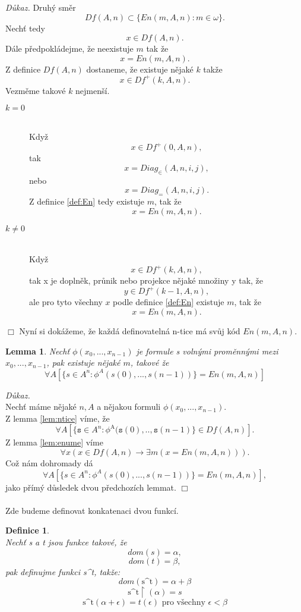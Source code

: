 \documentclass[12pt,a4paper]{article}
\newtheorem{lemma}[veta]{Lemma}
\newtheorem{definice}[veta]{Definice}
\newenvironment{proof}
{\noindent \textit{D\r{u}kaz.}}
{\hspace*{\fill} $\Box$}
\begin{document}
\begin{proof}
Druh\'{y} sm\v{e}r \[ Df(A,n) \subset\{En(m,A,n): m \in \omega \} .\] 
Nech\v{t} tedy \[  x \in  Df(A,n) .\] D\'{a}le p\v{r}edpokl\'{a}dejme, \v{z}e neexistuje $ m $ tak \v{z}e \[ x=En(m,A,n) .\]
Z definice  $ Df(A,n) $ dostaneme, \v{z}e existuje n\v{e}jak\'{e} $ k $ tak\v{z}e 
 \[  x \in  Df^+(k,A,n) .\] 
Vezm\v{e}me takov\'{e} $ k $ nejmen\v{s}\'{i}.
\begin{description}
  \item[$ k=0 $] ~\\ 
  Kdy\v{z} \[ x \in  Df^+(0,A,n), \] tak \[ x = Diag_{\in}(A,n,i,j) ,\] nebo \[ x = Diag_{=}(A,n,i,j) .\] 
  Z definice \ref{def:En} tedy existuje $ m $, tak \v{z}e \[ x=En(m,A,n) .\]
  \item[$ k \neq 0 $] ~\\
   Kdy\v{z} \[ x \in  Df^+(k,A,n), \] tak x je dopln\v{e}k, pr\r{u}nik nebo projekce n\v{e}jak\'{e} mno\v{z}iny y tak, \v{z}e \[ y \in  Df^+(k-1,A,n), \]  ale pro tyto v\v{s}echny $ x $ podle definice  \ref{def:En} existuje $ m $, tak \v{z}e \[ x=En(m,A,n) .\]
  \end{description}
 \end{proof}
\newpage
Nyn\'{i} si dok\'{a}\v{z}eme, \v{z}e ka\v{z}d\'{a} definovateln\'{a} n-tice m\'{a} sv\r{u}j k\'{o}d $ En(m,A,n) $.
\begin{lemma}
Nech\v{t} $ \phi(x_0,...,x_{n-1}) $ je formule s voln\'{y}mi prom\v{e}nn\'{y}mi mezi $ x_0,...,x_{n-1} $, pak existuje n\v{e}jak\'{e} $ m $, takov\'{e} \v{z}e
\[ \forall A [ \{ s \in A^n : \phi^A(s(0),...,s(n-1))\} = En(m,A,n)]  \]
\end{lemma}
\begin{proof}
~\\
Nech\v{t} m\'{a}me n\v{e}jak\'{e} $ n,A $ a n\v{e}jakou formuli $ \phi(x_0,...,x_{n-1}) $.\\  Z lemma \ref{lem:ntice} v\'{i}me, \v{z}e 
\[ \forall A [\{ \mathtt{s} \in A^n: \phi^\mathrm{A} (\mathtt{s}(0),..,\mathtt{s}(n-1)\} \in Df(A,n)]  . \]
Z lemma \ref{lem:enume} v\'{i}me 
\[ \forall x (x \in Df(A,n) \rightarrow \exists m (x = En(m,A,n))) .\]  
Co\v{z} n\'{a}m dohromady d\'{a}
\[ \forall A [ \{ s \in A^n : \phi^A(s(0),...,s(n-1))\} = En(m,A,n)] ,\]
jako p\v{r}\'{i}m\'{y} d\r{u}sledek dvou p\v{r}edchoz\'{i}ch lemmat.
\end{proof}~\\~\\
Zde budeme definovat konkatenaci dvou funkc\'{i}.
\begin{definice}
~\\
Nech\v{t} s a t jsou funkce takov\'{e}, \v{z}e  \[ dom(s)=\alpha ,\]  \[ dom(t)=\beta ,\]  pak definujme funkci s\textasciicircum t, tak\v{z}e: 
\[ dom(\text{s\textasciicircum t})=\alpha +\beta\]
 \[ \text{s\textasciicircum t} \upharpoonright( \alpha )= s  \]
\[  \text{s\textasciicircum t} (\alpha+\epsilon)=t(\epsilon) \text{  pro v\v{s}echny  } \epsilon < \beta  \]
\end{definice}
\end{document}
